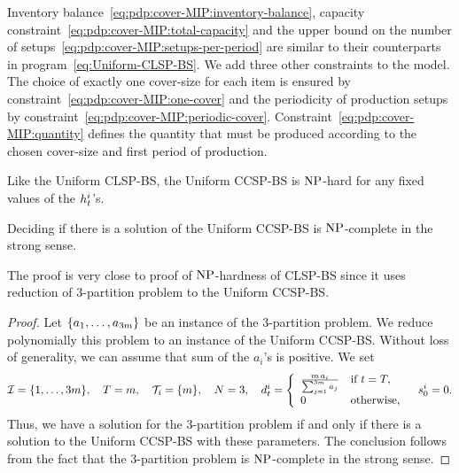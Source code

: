 Inventory balance~\eqref{eq:pdp:cover-MIP:inventory-balance}, capacity constraint~\eqref{eq:pdp:cover-MIP:total-capacity} and the upper bound on the number of setups~\eqref{eq:pdp:cover-MIP:setups-per-period} are similar to their counterparts in program~\eqref{eq:Uniform-CLSP-BS}.
We add three other constraints to the model.
The choice of exactly one cover-size for each item is ensured by constraint~\eqref{eq:pdp:cover-MIP:one-cover} and the periodicity of production setups by constraint~\eqref{eq:pdp:cover-MIP:periodic-cover}.
Constraint~\eqref{eq:pdp:cover-MIP:quantity} defines the quantity that must be produced according to the chosen cover-size and first period of production.




\medskip


Like the Uniform CLSP-BS, the Uniform CCSP-BS is $\operatorname{NP}$-hard for any fixed values of the $h_t^i$'s.


\begin{thm}
  Deciding if there is a solution of the Uniform CCSP-BS is $\operatorname{NP}$-complete in the strong sense.
\end{thm}


The proof is very close to proof of $\operatorname{NP}$-hardness of CLSP-BS since it uses reduction of 3-partition problem to the Uniform CCSP-BS.


\begin{proof}
Let $\crbracket{a_1,\ldots,a_{3m}}$ be an instance of the 3-partition problem.
We reduce polynomially this problem to an instance of the Uniform CCSP-BS.
Without loss of generality, we can assume that sum of the $a_i$'s is positive.
We set
\begin{equation}
  \REF=\range[1]{3m}
  ,\quad
  \horizon=m
  ,\quad
  \coverset_i=\crbracket{m}
  ,\quad
  \nbsetups=3
  ,\quad
  \demand_t^i
  =\left\{
  \begin{array}{ll}
  \frac{m\,a_i}{\sum_{j=1}^{3m}a_j} & \mbox{if}\ t=\horizon,
  \\
  0 & \mbox{otherwise,}\end{array}
  \right.
  \quad
  \inventory_0^i=0.
\end{equation}
Thus, we have a solution for the 3-partition problem if and only if there is a solution to the Uniform CCSP-BS with these parameters. The conclusion follows from the fact that the 3-partition problem is $\operatorname{NP}$-complete in the strong sense.
\end{proof}


